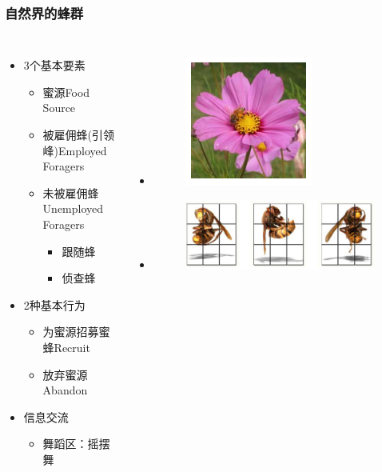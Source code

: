 \begin{frame}
	\frametitle{自然界的蜂群}
	\begin{columns}
		\begin{itemize}
			\item { 3个基本要素}
				\begin{itemize}
					\item { 蜜源Food Source}
					\item { 被雇佣蜂(引领峰)Employed Foragers}
					\item { 未被雇佣蜂Unemployed Foragers}
						\begin{itemize}
							\item { 跟随蜂 }
							\item { 侦查蜂 }
						\end{itemize}
				\end{itemize}
			\item { 2种基本行为}
				\begin{itemize}
					\item {为蜜源招募蜜蜂Recruit}
					\item {放弃蜜源Abandon}
				\end{itemize}
			 \item { 信息交流}
				\begin{itemize}
					\item {舞蹈区：摇摆舞}
				\end{itemize}
		\end{itemize}
		\begin{itemize}
			\item[ ] 
				\begin{figure}[htbp]
					\centering
					\includegraphics[scale=0.5]{pic/bee1.png}
				\end{figure}
			\item[ ]
				\begin{figure}[htbp]
					\centering
					\includegraphics[scale=0.5]{pic/bee2.png}

\end{figure}
\end{itemize}
\end{columns}
\end{frame}
